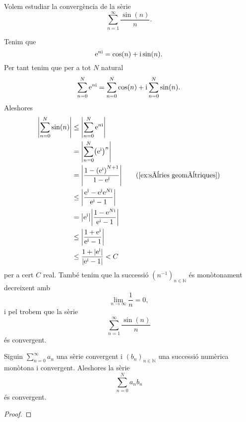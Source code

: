 \documentclass[../Apunts.tex]{subfiles}
\begin{document}
	\begin{example}%
		\label{ex:Teorema de Dirichlet per sèries numèriques}
		Volem estudiar la convergència de la sèrie
		\[\sum_{n=1}^{\infty}\frac{\sin(n)}{n}.\]
		\begin{solution} %
			Tenim que
			\[\textrm{e}^{n\textrm{i}}=\cos(n)+\textrm{i}\sin(n).\]
			Per tant tenim que per a tot \(N\) natural
			\[\sum_{n=0}^{N}\textrm{e}^{n\textrm{i}}=\sum_{n=0}^{N}\cos(n)+\textrm{i}\sum_{n=0}^{N}\sin(n).\]
			Aleshores
			\begin{align*}
				\abs{\sum_{n=0}^{N}\sin(n)}&\leq\abs{\sum_{n=0}^{N}\e^{n\iu}} \\
				&=\abs{\sum_{n=0}^{N}\left(\e^{\iu}\right)^{n}} \\
				&=\abs{\frac{1-\left(\e^{\iu}\right)^{N+1}}{1-\e^{\iu}}} \tag{\ref{ex:sèries geomètriques}}\\
				&\leq\abs{\frac{\e^{\iu}-\e^{\iu}\e^{N\iu}}{\e^{\iu}-1}} \\
				&=\abs{\e^{\iu}}\abs{\frac{1-\e^{N\iu}}{\e^{\iu}-1}} \\
				&\leq\abs{\frac{1+\e^{\iu}}{\e^{\iu}-1}} \\
				&\leq\frac{1+\abs{\e^{\iu}}}{\abs{\e^{\iu}-1}}<C \\
			\end{align*}
			per a cert \(C\) real. També tenim que la successió \((n^{-1})_{n\in\mathbb{N}}\) és monòtonament decreixent amb
			\[\lim_{n\to\infty}\frac{1}{n}=0,\]
			i pel  trobem que la sèrie
			\[\sum_{n=1}^{\infty}\frac{\sin(n)}{n}\]
			és convergent.
		\end{solution} %
	\end{example}
	\begin{theorem}
		\label{thm:Criteri d'Abel}
		Siguin \(\sum_{n=0}^{\infty}a_{n}\) una sèrie convergent i \((b_{n})_{n\in\mathbb{N}}\) una successió numèrica monòtona i convergent. Aleshores la sèrie
		\[\sum_{n=0}^{N}a_{n}b_{n}\]
		és convergent.
		\begin{proof}
		\end{proof}
	\end{theorem}	
\end{document}

